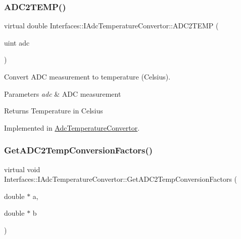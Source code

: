 \subsubsection{\texorpdfstring{A\+D\+C2\+T\+E\+M\+P()}{ADC2TEMP()}}
{\footnotesize\ttfamily virtual double Interfaces\+::\+I\+Adc\+Temperature\+Convertor\+::\+A\+D\+C2\+T\+E\+MP (\begin{DoxyParamCaption}\item[{uint}]{adc }\end{DoxyParamCaption})\hspace{0.3cm}{\ttfamily [pure virtual]}}



Convert A\+DC measurement to temperature (Celsius). 


\begin{DoxyParams}{Parameters}
{\em adc} & A\+DC measurement \\
\hline
\end{DoxyParams}
\begin{DoxyReturn}{Returns}
Temperature in Celsius 
\end{DoxyReturn}


Implemented in \hyperlink{class_adc_temperature_convertor_a3ee4549435400d9ed319fd5fdb83c97f}{Adc\+Temperature\+Convertor}.

\mbox{\label{class_interfaces_1_1_i_adc_temperature_convertor_a61cff0aa0590906acfb18c9b789dceb2}} 
\subsubsection{\texorpdfstring{Get\+A\+D\+C2\+Temp\+Conversion\+Factors()}{GetADC2TempConversionFactors()}}
{\footnotesize\ttfamily virtual void Interfaces\+::\+I\+Adc\+Temperature\+Convertor\+::\+Get\+A\+D\+C2\+Temp\+Conversion\+Factors (\begin{DoxyParamCaption}\item[{double $\ast$}]{a,  }\item[{double $\ast$}]{b }\end{DoxyParamCaption})\hspace{0.3cm}{\ttfamily [pure virtual]}}



